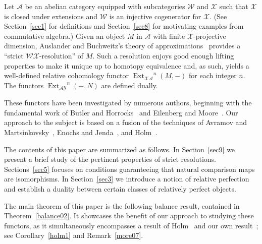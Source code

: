 \documentclass{amsart}
\begin{document}
Let ${{\mathcal{{A}}}}$ be an abelian category equipped with subcategories
${{\mathcal{{W}}}}$ and ${{\mathcal{{X}}}}$ such that ${{\mathcal{{X}}}}$ is closed under extensions
and ${{\mathcal{{W}}}}$ is an injective cogenerator for ${{\mathcal{{X}}}}$.  
(See Section~\ref{sec1} for definitions and Section~\ref{sec8}
for motivating examples from commutative algebra.)
Given an object
$M$ in ${{\mathcal{{A}}}}$ with finite ${{\mathcal{{X}}}}$-projective dimension, 
Auslander and Buchweitz's theory of approximations~\cite{auslander:htmcma}
provides a ``strict ${{\mathcal{{W}}}}{{\mathcal{{X}}}}$-resolution''  of $M$.  Such a resolution 
enjoys good enough lifting properties to make it unique up to homotopy
equivalence and, as such, yields a well-defined relative cohomology
functor ${{\operatorname{Ext}}_{{{\mathcal{{X}}}}\!{{\mathcal{{A}}}}}}^n(M,-)$ for each integer $n$.  
The functors ${{\operatorname{Ext}}_{{{\mathcal{{A}}}}{{\mathcal{{Y}}}}}}^n(-,N)$ are defined dually.

These functors have been investigated by numerous authors,
beginning with the fundamental work of 
Butler and Horrocks~\cite{butler:cer}
and 
Eilenberg and Moore~\cite{eilenberg:frha}.
Our approach to the subject is based on a fusion
of the techniques of 
Avramov and Martsinkovsky~\cite{avramov:aratc},
Enochs and Jenda~\cite{enochs:rha},
and Holm~\cite{holm:gdf}.

The contents of this paper are summarized as follows.
In Section~\ref{sec9} we present a brief study of
the pertinent  properties of strict resolutions.
Sections~\ref{sec5} focuses on 
conditions guaranteeing that natural comparison
maps are isomorphisms.
In Section~\ref{sec3}  we introduce a notion of relative perfection
and establish a duality between certain classes of relatively perfect objects.  

The main theorem of this paper is the following balance result,
contained in Theorem~\ref{balance02}.  It showcases the benefit
of our  approach to studying these functors, as it 
simultaneously encompasses a result of Holm~\cite[(3.6)]{holm:gdf}
and our own result~\cite[(5.7)]{sather:crct};
see Corollary~\ref{holm1} and Remark~\ref{more07}.

\
\end{document}
